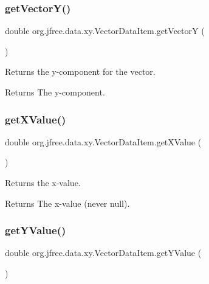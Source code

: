 \subsubsection{\texorpdfstring{get\+Vector\+Y()}{getVectorY()}}
{\footnotesize\ttfamily double org.\+jfree.\+data.\+xy.\+Vector\+Data\+Item.\+get\+VectorY (\begin{DoxyParamCaption}{ }\end{DoxyParamCaption})}

Returns the y-\/component for the vector.

\begin{DoxyReturn}{Returns}
The y-\/component. 
\end{DoxyReturn}
\mbox{\label{classorg_1_1jfree_1_1data_1_1xy_1_1_vector_data_item_a218f9c23039c2effc8308eac0d4d9f58}} 
\subsubsection{\texorpdfstring{get\+X\+Value()}{getXValue()}}
{\footnotesize\ttfamily double org.\+jfree.\+data.\+xy.\+Vector\+Data\+Item.\+get\+X\+Value (\begin{DoxyParamCaption}{ }\end{DoxyParamCaption})}

Returns the x-\/value.

\begin{DoxyReturn}{Returns}
The x-\/value (never {\ttfamily null}). 
\end{DoxyReturn}
\mbox{\label{classorg_1_1jfree_1_1data_1_1xy_1_1_vector_data_item_a6c59869ba389fd3712d943d268d11df9}} 
\subsubsection{\texorpdfstring{get\+Y\+Value()}{getYValue()}}
{\footnotesize\ttfamily double org.\+jfree.\+data.\+xy.\+Vector\+Data\+Item.\+get\+Y\+Value (\begin{DoxyParamCaption}{ }\end{DoxyParamCaption})}

